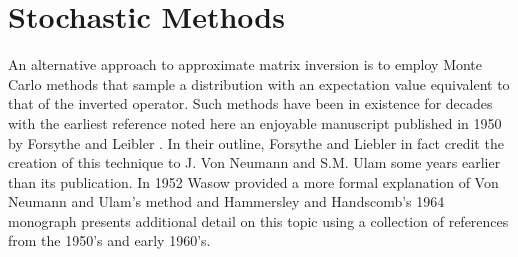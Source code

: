 \section{Stochastic Methods}
\label{sec:stochastic_methods}
An alternative approach to approximate matrix inversion is to employ
Monte Carlo methods that sample a distribution with an expectation
value equivalent to that of the inverted operator. Such methods have
been in existence for decades with the earliest reference noted here
an enjoyable manuscript published in 1950 by Forsythe and Leibler
\citep{forsythe_matrix_1950}. In their outline, Forsythe and Liebler
in fact credit the creation of this technique to J. Von Neumann and
S.M. Ulam some years earlier than its publication. In 1952 Wasow
provided a more formal explanation of Von Neumann and Ulam's method
\citep{wasow_note_1952} and Hammersley and Handscomb's 1964 monograph
\citep{hammersley_monte_1964} presents additional detail on this topic
using a collection of references from the 1950's and early 1960's.

